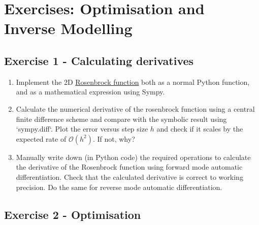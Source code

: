 \documentclass[a4paper]{article}
\begin{document}
\section*{Exercises: Optimisation and Inverse Modelling}

\vspace{0,75cm}


\subsection*{Exercise 1 - Calculating derivatives}

\begin{enumerate}[label=\Alph*]
\item Implement the 2D \href{https://en.wikipedia.org/wiki/Rosenbrock_function}{Rosenbrock
function} both as a normal Python
function, and as a mathematical expression using Sympy.

\item Calculate the numerical derivative of the rosenbrock function using a central
  finite difference scheme and compare with the symbolic result using `sympy.diff`. Plot
    the error versus step size $h$ and check if it scales by the expected rate of
    $\mathcal{O}(h^2)$. If not, why?

\item Manually write down (in Python code) the required operations to calculate the
    derivative of the Rosenbrock function using forward mode automatic differentiation.
    Check that the calculated derivative is correct to working precision. Do the same
    for reverse mode automatic differentiation. 
\end{enumerate}

\subsection*{Exercise 2 - Optimisation}
\end{document}
